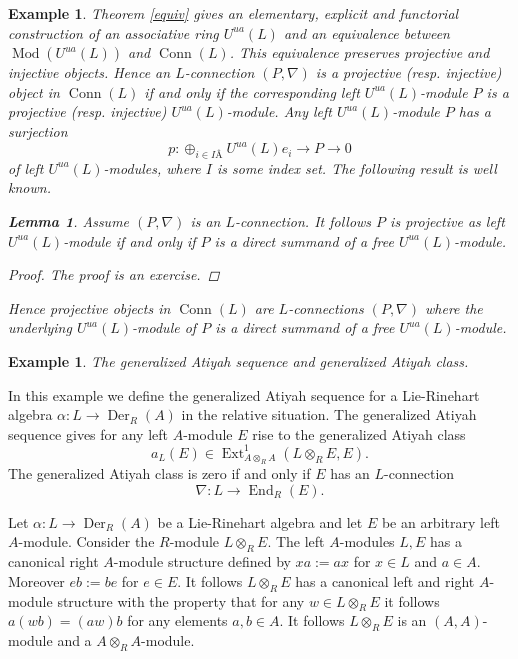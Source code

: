 \documentclass{amsart}
\theoremstyle{plain}
\newtheorem{lemma}[theorem]{Lemma}
\newtheorem{example}[theorem]{Example}
\theoremstyle{definition}
\theoremstyle{remark}
\numberwithin{equation}{theorem}
\begin{document}
\begin{example} 

Theorem \ref{equiv} gives an elementary, explicit and functorial
construction of an associative ring ${U^{ua}}(L)$ and an equivalence between ${\operatorname{Mod}}({U^{ua}}(L))$ and ${\operatorname{Conn}}(L)$. This equivalence
preserves projective and injective objects. Hence an $L$-connection $(P, \nabla)$ is a projective (resp. injective) object
in ${\operatorname{Conn}}(L)$ if and only if the corresponding left ${U^{ua}}(L)$-module $P$ is a projective (resp. injective) ${U^{ua}}(L)$-module.
Any left ${U^{ua}}(L)$-module $P$ has a surjection
\[ p:\oplus_{i\in IÂ } {U^{ua}}(L)e_i \rightarrow P \rightarrow 0\]
of left ${U^{ua}}(L)$-modules, where $I$ is some index set. The following result is well known.

\begin{lemma} Assume $(P,\nabla)$ is an $L$-connection. It follows $P$ is projective as left ${U^{ua}}(L)$-module 
if and only if $P$ is a direct summand of a free
${U^{ua}}(L)$-module.
\end{lemma}
\begin{proof} The proof is an exercise.
\end{proof}

Hence projective objects in ${\operatorname{Conn}}(L)$ are $L$-connections $(P,\nabla)$ where the underlying
${U^{ua}}(L)$-module of $P$ is a direct summand of a free ${U^{ua}}(L)$-module.
\end{example}

\begin{example} The generalized Atiyah sequence and generalized Atiyah class.\end{example}

In this example we define the generalized Atiyah sequence for a Lie-Rinehart algebra $\alpha:L\rightarrow {\operatorname{Der} }_{R}({A})$
in the relative situation.
The generalized Atiyah sequence gives for any left ${A}$-module $E$ rise to the generalized Atiyah class
\[ a_{L}(E)\in {\operatorname{Ext} }^1_{{A}\otimes_{R}{A}}(L\otimes_{R} E, E).\]
The generalized Atiyah class is zero if and only if $E$ has an $L$-connection
\[ \nabla:L\rightarrow {\operatorname{End} }_{R}(E).\]

Let $\alpha:L\rightarrow {\operatorname{Der} }_{R}({A})$ be a Lie-Rinehart algebra and let $E$ be an arbitrary left ${A}$-module.
Consider the ${R}$-module $L\otimes_{R} E$. The left ${A}$-modules $L,E$ has a canonical right ${A}$-module structure
defined by $xa:=ax$ for $x\in L$ and $a\in {A}$. Moreover $eb:=be$ for $e\in E$. It follows $L\otimes_{R} E$ has a canonical
left and right ${A}$-module structure with the property that for any $w\in L\otimes_{R} E$ it follows
$a(wb)=(aw)b$ for any elements $a,b\in {A}$. It follows $L\otimes_{R} E$ is an $({A},{A})$-module and a ${A}\otimes_{R} {A}$-module.
\end{document}
